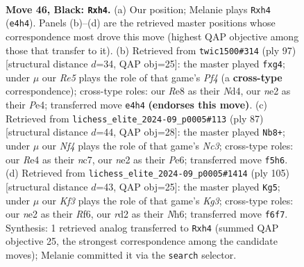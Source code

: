 \documentclass[11pt]{article}
\begin{document}
\clearpage

\begin{figure}[p]\centering
\begin{subfigure}{0.46\textwidth}\centering
\resizebox{\linewidth}{!}{%
\newchessgame
\chessboard[
  setfen={4r3/8/3p1kp1/5n1p/4r2P/1p6/3RNKP1/R7 b - - 1 46},
  showmover=false,
  pgfstyle=straightmove, color=movearrow, markmove={e4-h4}
]}
\caption{}
\end{subfigure}\hfill
\begin{subfigure}{0.46\textwidth}\centering
\resizebox{\linewidth}{!}{%
\newchessgame
\chessboard[
  setfen={8/5kp1/7p/5p2/3np1PP/4R3/3r1P2/4NK2 b - - 0 49},
  showmover=false,
  pgfstyle=straightmove, color=movearrow, markmove={f5-g4}
]}
\caption{}
\end{subfigure}
\\[4pt]
\begin{subfigure}{0.46\textwidth}\centering
\resizebox{\linewidth}{!}{%
\newchessgame
\chessboard[
  setfen={8/2N1kp2/K1n1p2p/P1r3p1/R7/6P1/1r6/8 b - - 4 44},
  showmover=false,
  pgfstyle=straightmove, color=movearrow, markmove={c6-b8}
]}
\caption{}
\end{subfigure}\hfill
\begin{subfigure}{0.46\textwidth}\centering
\resizebox{\linewidth}{!}{%
\newchessgame
\chessboard[
  setfen={8/p7/2p2rkn/1pP5/1P2R1p1/2K1N3/P7/8 b - - 1 53},
  showmover=false,
  pgfstyle=straightmove, color=movearrow, markmove={g6-g5}
]}
\caption{}
\end{subfigure}
\caption{\textbf{Move 46, Black: \texttt{Rxh4}.} (a) Our position; Melanie plays \texttt{Rxh4} (\texttt{e4h4}). Panels (b)--(d) are the retrieved master positions whose correspondence most drove this move (highest QAP objective among those that transfer to it). (b) Retrieved from \texttt{twic1500\#314} (ply 97) [structural distance $d$=34, QAP obj=25]: the master played \texttt{fxg4}; under $\mu$ our \emph{Re5} plays the role of that game's \emph{Pf4} (a \textbf{cross-type} correspondence); cross-type roles: our \emph{R}e8 as their \emph{N}d4, our \emph{n}e2 as their \emph{P}e4; transferred move \texttt{e4h4} \textbf{(endorses this move)}. (c) Retrieved from \texttt{lichess\_elite\_2024-09\_p0005\#113} (ply 87) [structural distance $d$=44, QAP obj=28]: the master played \texttt{Nb8+}; under $\mu$ our \emph{Nf4} plays the role of that game's \emph{Nc3}; cross-type roles: our \emph{R}e4 as their \emph{n}c7, our \emph{n}e2 as their \emph{P}e6; transferred move \texttt{f5h6}. (d) Retrieved from \texttt{lichess\_elite\_2024-09\_p0005\#1414} (ply 105) [structural distance $d$=43, QAP obj=25]: the master played \texttt{Kg5}; under $\mu$ our \emph{Kf3} plays the role of that game's \emph{Kg3}; cross-type roles: our \emph{n}e2 as their \emph{R}f6, our \emph{r}d2 as their \emph{N}h6; transferred move \texttt{f6f7}. Synthesis: 1 retrieved analog transferred to \texttt{Rxh4} (summed QAP objective 25, the strongest correspondence among the candidate moves); Melanie committed it via the \texttt{search} selector.}
\label{fig:thought-m91}
\end{figure}
\end{document}
